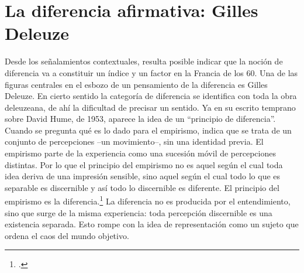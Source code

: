 \documentclass{book}
\begin{document}
\section{La diferencia afirmativa: Gilles Deleuze}

Desde los señalamientos contextuales, resulta posible indicar que la
noción de diferencia va a constituir un índice y un factor en la Francia
de los 60. Una de las figuras centrales en el esbozo de un pensamiento
de la diferencia es Gilles Deleuze. En cierto sentido la categoría de
diferencia se identifica con toda la obra deleuzeana, de ahí la
dificultad de precisar un sentido. Ya en su escrito temprano sobre David
Hume, de 1953, aparece la idea de un \enquote{principio de diferencia}. Cuando
se pregunta qué es lo dado para el empirismo, indica que se trata de un
conjunto de percepciones --un movimiento--, sin una identidad previa. El
empirismo parte de la experiencia como una sucesión móvil de
percepciones distintas. Por lo que el principio del empirismo no es
aquel según el cual toda idea deriva de una impresión sensible, sino
aquel según el cual todo lo que es separable es discernible y así todo
lo discernible es diferente. El principio del empirismo es la
diferencia.\footcite{deleuze1996} La diferencia no es producida por el
entendimiento, sino que surge de la misma experiencia: toda percepción
discernible es una existencia separada. Esto rompe con la idea de
representación como un sujeto que ordena el caos del mundo objetivo.
\end{document}

